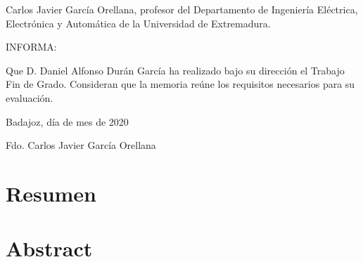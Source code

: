 \documentclass[12pt,dvipsnames,a4paper,twoside]{article}
\begin{document}


\shipout\null %

\pagestyle{empty}
\vspace*{5cm}

Carlos Javier García Orellana, profesor del
Departamento de Ingeniería Eléctrica, Electrónica y Automática de la Universidad de
Extremadura.

INFORMA:

Que D. Daniel Alfonso Durán García ha realizado
bajo su dirección el Trabajo Fin de Grado. Consideran que la memoria reúne
los requisitos necesarios para su evaluación.

\vspace*{1cm}
\begin{center}
Badajoz, día de mes de 2020


\vspace{5cm}
Fdo. Carlos Javier García Orellana
\end{center}

\newpage %
\setcounter{page}{1}
\pagestyle{plain}

\tableofcontents



\newpage
\section*{Resumen}




\section*{Abstract}



\let\oldsection\section%
\renewcommand{\section}{\cleardoublepage\oldsection}%
\end{document}
